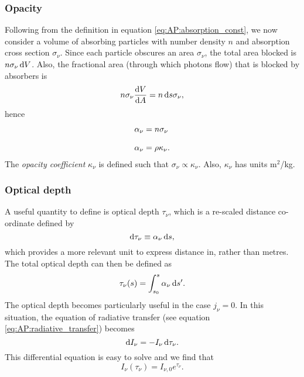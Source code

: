 \subsubsection{Opacity}
Following from the definition in equation \ref{eq:AP:absorption_const}, we now consider a volume of absorbing particles with number density $n$ and absorption cross section $\sigma_\nu$.
 Since each particle obscures an area $\sigma_\nu$, the total area blocked is $n\sigma_\nu\mathop{}\!\mathrm{d} V$.
 Also, the fractional area (through which photons flow) that is blocked by absorbers is
$$ n \sigma_\nu \frac{\mathop{}\!\mathrm{d} V}{\mathop{}\!\mathrm{d} A} = n \mathop{}\!\mathrm{d} s \sigma_\nu, $$
hence
% 
\begin{align*}
	\alpha_\nu &= n \sigma_\nu	
	\linedrop
	\alpha_\nu &= \rho \kappa_\nu.
\end{align*}
%
The \emph{opacity coefficient} $\kappa_\nu$ is defined such that $\sigma_\nu \propto \kappa_\nu$. Also, $\kappa_\nu$ has units m$^2$/kg.
\par 
\subsubsection{Optical depth}
A useful quantity to define is optical depth $\tau_\nu$, which is a re-scaled distance co-ordinate defined by
$$ \mathop{}\!\mathrm{d} \tau_\nu \equiv \alpha_\nu \mathop{}\!\mathrm{d} s, $$
which provides a more relevant unit to express distance in, rather than metres.
 The total optical depth can then be defined as
$$ \tau_\nu (s) = \int_{s_0}^{s} \alpha_\nu \mathop{}\!\mathrm{d} s^\prime. $$
The optical depth becomes particularly useful in the case $j_\nu = 0$.
 In this situation, the equation of radiative transfer (see equation \ref{eq:AP:radiative_transfer}) becomes
$$ \mathop{}\!\mathrm{d} I_\nu = - I_\nu \mathop{}\!\mathrm{d} \tau_\nu. $$
This differential equation is easy to solve and we find that
%
\begin{equation}
I_\nu (\tau_\nu) = I_{\nu,0} e^{\tau_\nu}.
\end{equation}
%
\par 

